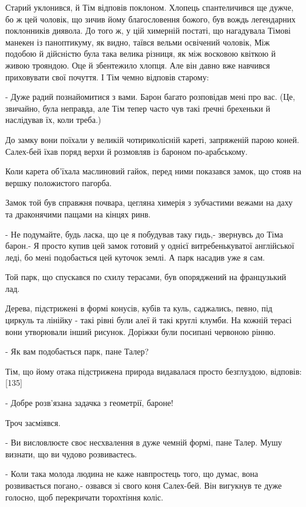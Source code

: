 Старий уклонився, й Тім відповів поклоном. Хлопець спантеличився ще дужче, бо ж цей чоловік, що зичив йому благословення божого, був вождь легендарних поклонників диявола. До того ж, у цій химерній постаті, що нагадувала Тімові манекен із паноптикуму, як видно, таївся вельми освічений чоловік, Між подобою й дійсністю була така велика різниця, як між восковою квіткою й живою трояндою. Оце й збентежило хлопця. Але він давно вже навчився приховувати свої почуття. І Тім чемно відповів старому:

- Дуже радий познайомитися з вами. Барон багато розповідав мені про вас. (Це, звичайно, була неправда, але Тім тепер часто чув такі ґречні брехеньки й наслідував їх, коли треба.)

До замку вони поїхали у великій чотириколісній кареті, запряженій парою коней. Салех-бей їхав поряд верхи й розмовляв із бароном по-арабському.

Коли карета об'їхала маслиновий гайок, перед ними показався замок, що стояв на вершку положистого пагорба.

Замок той був справжня почвара, цегляна химерія з зубчастими вежами на даху та драконячими пащами на кінцях ринв.

- Не подумайте, будь ласка, що це я побудував таку гидь,- звернувсь до Тіма барон.- Я просто купив цей замок готовий у однієї витребенькуватої англійської леді, бо мені подобається цей куточок землі. А парк насадив уже я сам.

Той парк, що спускався по схилу терасами, був опоряджений на французький лад.

Дерева, підстрижені в формі конусів, кубів та куль, саджались, певно, під циркуль та лінійку - такі рівні були алеї й такі круглі клумби. На кожній терасі вони утворювали інший рисунок. Доріжки були посипані червоною рінню.

- Як вам подобається парк, пане Талер?

Тім, що йому отака підстрижена природа видавалася просто безглуздою, відповів: [135]

- Добре розв'язана задачка з геометрії, бароне!

Троч засміявся.

- Ви висловлюєте своє несхвалення в дуже чемній формі, пане Талер. Мушу визнати, що ви чудово розвиваєтесь.

- Коли така молода людина не каже навпростець того, що думає, вона розвивається погано,- озвався зі свого коня Салех-бей. Він вигукнув те дуже голосно, щоб перекричати торохтіння коліс.

